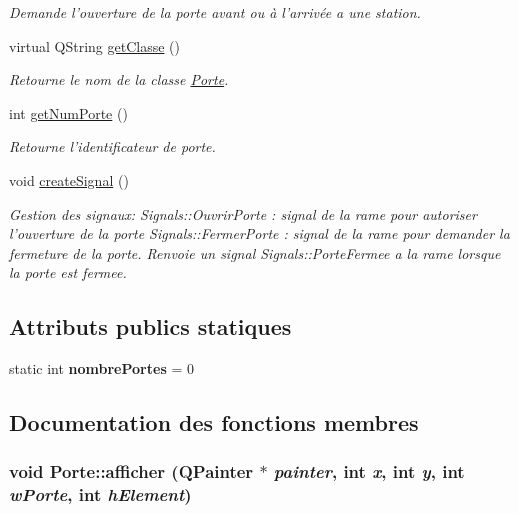\begin{DoxyCompactItemize}
\begin{DoxyCompactList}\small\item\em Demande l'ouverture de la porte avant ou à l'arrivée a une station. \item\end{DoxyCompactList}\item 
virtual QString \hyperlink{classPorte_a773001136f190566b51b4e24c4323409}{getClasse} ()
\begin{DoxyCompactList}\small\item\em Retourne le nom de la classe \hyperlink{classPorte}{Porte}. \item\end{DoxyCompactList}\item 
int \hyperlink{classPorte_a65ae951c733e2741c6dcc5ef336ff7d4}{getNumPorte} ()
\begin{DoxyCompactList}\small\item\em Retourne l'identificateur de porte. \item\end{DoxyCompactList}\item 
\hypertarget{classPorte_ab87d9b41a1a6a877318da3f336392744}{
void \hyperlink{classPorte_ab87d9b41a1a6a877318da3f336392744}{createSignal} ()}
\label{classPorte_ab87d9b41a1a6a877318da3f336392744}

\begin{DoxyCompactList}\small\item\em Gestion des signaux: Signals::OuvrirPorte : signal de la rame pour autoriser l'ouverture de la porte Signals::FermerPorte : signal de la rame pour demander la fermeture de la porte. Renvoie un signal Signals::PorteFermee a la rame lorsque la porte est fermee. \item\end{DoxyCompactList}\end{DoxyCompactItemize}
\subsection*{Attributs publics statiques}
\begin{DoxyCompactItemize}
\item 
\hypertarget{classPorte_ace96ffd106c02645ae1f9e50d77f54bf}{
static int {\bfseries nombrePortes} = 0}
\label{classPorte_ace96ffd106c02645ae1f9e50d77f54bf}

\end{DoxyCompactItemize}


\subsection{Documentation des fonctions membres}
\hypertarget{classPorte_a612d63b6b888d391ac7ab3530cb6fecb}{
\subsubsection[{afficher}]{\setlength{\rightskip}{0pt plus 5cm}void Porte::afficher (QPainter $\ast$ {\em painter}, \/  int {\em x}, \/  int {\em y}, \/  int {\em wPorte}, \/  int {\em hElement})}}
\label{classPorte_a612d63b6b888d391ac7ab3530cb6fecb}


